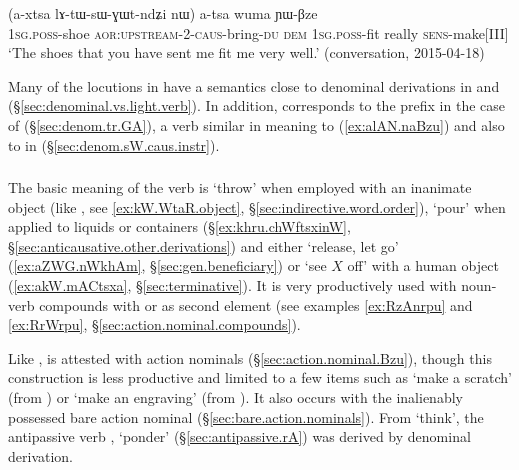  \begin{exe}
\ex \label{ex:atsa.YWBze}
\gll  (a-xtsa lɤ-tɯ-sɯ-ɣɯt-ndʑi nɯ) a-tsa wuma ɲɯ-βze \\
\textsc{1sg}.\textsc{poss}-shoe \textsc{aor}:\textsc{upstream}-2-\textsc{caus}-bring-\textsc{du} \textsc{dem}    \textsc{1sg}.\textsc{poss}-fit really \textsc{sens}-make[III] \\
 \glt `The shoes that you have sent me fit me very well.' (conversation, 2015-04-18)
 \end{exe}

Many of the locutions in  have a semantics close to denominal derivations in  and  (§\ref{sec:denominal.vs.light.verb}).  In addition,  corresponds to the  prefix in the case of  (§\ref{sec:denom.tr.GA}), a verb similar in meaning to  (\ref{ex:alAN.naBzu}) and also to  in  (§\ref{sec:denom.sW.caus.instr}).
 
 \subsubsection{ } \label{sec:lAt.lv}
The basic meaning of the verb  is `throw' when employed with an inanimate object (like , see \ref{ex:kW.WtaR.object}, §\ref{sec:indirective.word.order}), `pour' when applied to liquids or containers (§\ref{ex:khru.chWftsxinW}, §\ref{sec:anticausative.other.derivations}) and either `release, let go'  (\ref{ex:aZWG.nWkhAm}, §\ref{sec:gen.beneficiary}) or `see $X$ off'
with a human object (\ref{ex:akW.mACtsxa}, §\ref{sec:terminative}). It is very productively used with noun-verb compounds with  or   as second element (see examples \ref{ex:RzAnrpu} and \ref{ex:RrWrpu}, §\ref{sec:action.nominal.compounds}).
 
Like ,   is attested with  action nominals (§\ref{sec:action.nominal.Bzu}), though this construction is less productive and limited to a few items such as  `make a scratch' (from ) or  `make an engraving'  (from ). It also occurs with the inalienably possessed bare action nominal  (§\ref{sec:bare.action.nominals}). From  `think', the antipassive verb , `ponder' (§\ref{sec:antipassive.rA}) was derived by denominal derivation.

